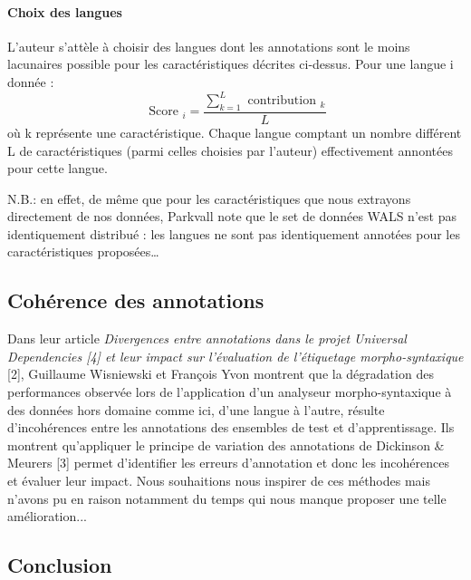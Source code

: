 \documentclass[a4paper, twoside]{article}
\begin{document}
    \paragraph{Choix des langues}

    L’auteur s’attèle à choisir des langues dont les annotations sont le moins lacunaires possible pour les caractéristiques décrites ci-dessus. Pour une langue i donnée :
    \begin{equation}
    \text { Score }_{i}=\frac{\sum_{k=1}^{L} \text { contribution }_{k}}{L}
    \end{equation}
    où k représente une caractéristique. Chaque langue comptant un nombre différent L de caractéristiques (parmi celles choisies par l'auteur) effectivement annontées pour cette langue. \par
    N.B.: en effet, de même que pour les caractéristiques que nous extrayons directement de nos données, Parkvall note que le set de données WALS n’est pas identiquement distribué : les langues ne sont pas identiquement annotées pour les caractéristiques proposées…

    \subsection{Cohérence des annotations}

    Dans leur article \textit{Divergences entre annotations dans le projet Universal Dependencies [4] et leur impact sur l’évaluation de l’étiquetage morpho-syntaxique} [2], Guillaume Wisniewski et François Yvon montrent que la dégradation des performances observée lors de l’application d’un analyseur morpho-syntaxique à des données hors domaine comme ici, d'une langue à l'autre, résulte d’incohérences entre les annotations des ensembles de test et d’apprentissage. Ils montrent qu'appliquer le principe de variation des annotations de Dickinson \& Meurers [3] permet d'identifier les erreurs d’annotation et donc les incohérences et évaluer leur impact. Nous souhaitions nous inspirer de ces méthodes mais n'avons pu en raison notamment du temps qui nous manque proposer une telle amélioration...

    \subsection{Conclusion}

\end{document}
